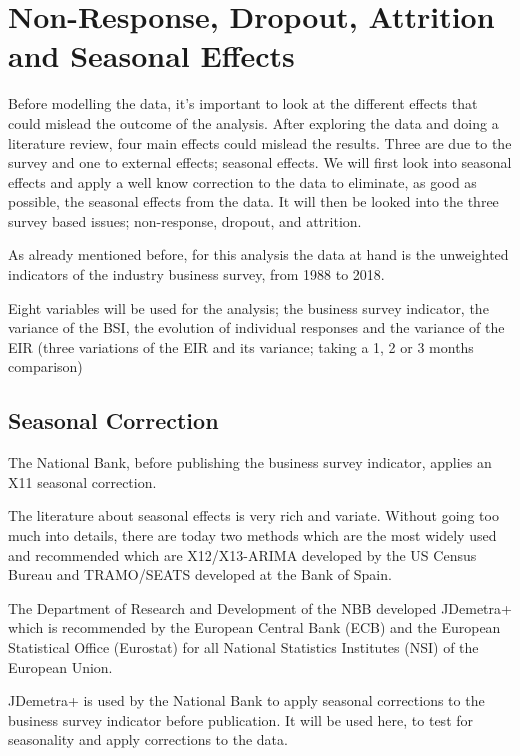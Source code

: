 \documentclass[12pt,a4paper,oneside]{book}
\begin{document}
\chapter{Non-Response, Dropout, Attrition and Seasonal Effects}
\label{chap:nonresponse dropout}

Before modelling the data, it's important to look at the different effects that could mislead the outcome of the analysis. After exploring the data and doing a literature review, four main effects could mislead the results. Three are due to the survey and one to external effects; seasonal effects. We will first look into seasonal effects and apply a well know correction to the data to eliminate, as good as possible, the seasonal effects from the data.
It will then be looked into the three survey based issues; non-response, dropout, and attrition.

As already mentioned before, for this analysis the data at hand is the unweighted indicators of the industry business survey, from 1988 to 2018.

Eight variables will be used for the analysis; the business survey indicator, the variance of the BSI, the evolution of individual responses and the variance of the EIR (three variations of the EIR and its variance; taking a 1, 2 or 3 months comparison) 

\section{Seasonal Correction}
\label{sec:seasonal correction}

The National Bank, before publishing the business survey indicator, applies an X11 seasonal correction.

The literature about seasonal effects is very rich and variate. Without going too much into details, there are today two methods which are the most widely used and recommended which are X12/X13-ARIMA developed by the US Census Bureau and TRAMO/SEATS developed at the Bank of Spain. 

The Department of Research and Development of the NBB developed JDemetra+ which is recommended by the European Central Bank (ECB) and the European Statistical Office (Eurostat) for all National Statistics Institutes (NSI) of the European Union. 

JDemetra+ is used by the National Bank to apply seasonal corrections to the business survey indicator before publication. It will be used here, to test for seasonality and apply corrections to the data.
\end{document}
